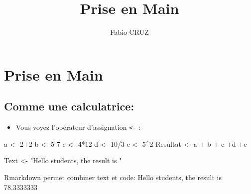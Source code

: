 \documentclass[
]{article}
\title{Prise en Main}
\author{Fabio CRUZ}
\date{}
\newenvironment{Shaded}{\begin{snugshade}}{\end{snugshade}}
\newcommand{\DecValTok}[1]{\textcolor[rgb]{0.00,0.00,0.81}{#1}}
\newcommand{\NormalTok}[1]{#1}
\newcommand{\OtherTok}[1]{\textcolor[rgb]{0.56,0.35,0.01}{#1}}
\newcommand{\SpecialCharTok}[1]{\textcolor[rgb]{0.00,0.00,0.00}{#1}}
\newcommand{\StringTok}[1]{\textcolor[rgb]{0.31,0.60,0.02}{#1}}
\providecommand{\tightlist}{%
  \setlength{\itemsep}{0pt}\setlength{\parskip}{0pt}}
\begin{document}
\maketitle

{
\setcounter{tocdepth}{3}
\tableofcontents
}
\hypertarget{prise-en-main}{%
\section{Prise en Main}\label{prise-en-main}}

\hypertarget{comme-une-calculatrice}{%
\subsection{Comme une calculatrice:}\label{comme-une-calculatrice}}

\begin{itemize}
\tightlist
\item
  Vous voyez l'opérateur d'assignation \texttt{\textless{}-} :
\end{itemize}

\begin{Shaded}
\begin{Highlighting}[]
\NormalTok{a }\OtherTok{\textless{}{-}} \DecValTok{2}\SpecialCharTok{+}\DecValTok{2}
\NormalTok{b }\OtherTok{\textless{}{-}} \DecValTok{5{-}7}
\NormalTok{c }\OtherTok{\textless{}{-}} \DecValTok{4}\SpecialCharTok{*}\DecValTok{12}
\NormalTok{d }\OtherTok{\textless{}{-}} \DecValTok{10}\SpecialCharTok{/}\DecValTok{3}
\NormalTok{e }\OtherTok{\textless{}{-}} \DecValTok{5}\SpecialCharTok{\^{}}\DecValTok{2}
\NormalTok{Resultat }\OtherTok{\textless{}{-}}\NormalTok{ a }\SpecialCharTok{+}\NormalTok{ b }\SpecialCharTok{+}\NormalTok{ c }\SpecialCharTok{+}\NormalTok{d }\SpecialCharTok{+}\NormalTok{e}

\NormalTok{Text }\OtherTok{\textless{}{-}} \StringTok{"Hello students, the result is "}
\end{Highlighting}
\end{Shaded}

Rmarkdown permet combiner text et code: Hello students, the result is
78.3333333
\end{document}
